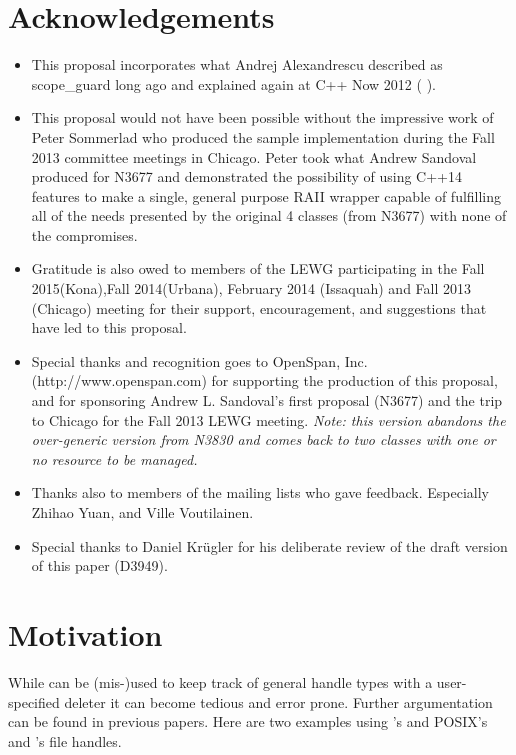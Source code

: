 \documentclass[ebook,11pt,article]{memoir}
\begin{document}
\chapter{Acknowledgements}
\begin{itemize}
\item This proposal incorporates what Andrej Alexandrescu described as scope_guard long ago and explained again at C++ Now 2012 (%
).
\item This proposal would not have been possible without the impressive work of Peter Sommerlad who produced the sample implementation during the Fall 2013 committee meetings in Chicago.  Peter took what Andrew Sandoval produced for N3677 and demonstrated the possibility of using C++14 features to make a single, general purpose RAII wrapper capable of fulfilling all of the needs presented by the original 4 classes (from N3677) with none of the compromises.
\item Gratitude is also owed to members of the LEWG participating in the Fall 2015(Kona),Fall 2014(Urbana), February 2014 (Issaquah) and Fall 2013 (Chicago) meeting for their support, encouragement, and suggestions that have led to this proposal.
\item Special thanks and recognition goes to OpenSpan, Inc. (http://www.openspan.com) for supporting the production of this proposal, and for sponsoring Andrew L. Sandoval's first proposal (N3677) and the trip to Chicago for the Fall 2013 LEWG meeting. \emph{Note: this version abandons the over-generic version from N3830 and comes back to two classes with one or no resource to be managed.}
\item Thanks also to members of the mailing lists who gave feedback. Especially Zhihao Yuan, and Ville Voutilainen.
\item Special thanks to Daniel Kr\"ugler for his deliberate review of the draft version of this paper (D3949).
\end{itemize}
\newpage
\chapter{Motivation}
While  can be (mis-)used to keep track of general handle types with a user-specified deleter it can become tedious and error prone. Further argumentation can be found in previous papers. Here are two examples using  's  and POSIX's and 's  file handles. 
\end{document}
